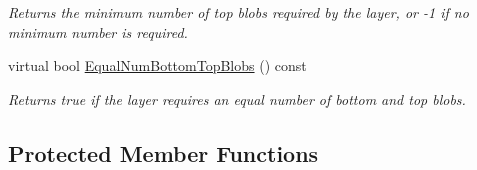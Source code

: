 \begin{DoxyCompactItemize}
\begin{DoxyCompactList}\small\item\em Returns the minimum number of top blobs required by the layer, or -\/1 if no minimum number is required. \end{DoxyCompactList}\item 
virtual bool \mbox{\hyperlink{classcaffe_1_1_base_convolution_layer_ad8e839460bf52abe3df2008b99a1810d}{Equal\+Num\+Bottom\+Top\+Blobs}} () const
\begin{DoxyCompactList}\small\item\em Returns true if the layer requires an equal number of bottom and top blobs. \end{DoxyCompactList}\end{DoxyCompactItemize}
\subsection*{Protected Member Functions}
